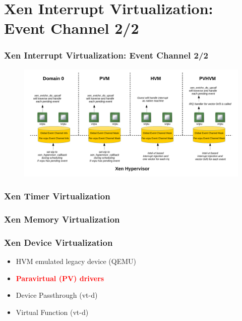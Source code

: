 \documentclass[aspectratio=169]{beamer}
\begin{document}

\section{Xen Interrupt Virtualization: Event Channel 2/2}
\begin{frame}
\frametitle{Xen Interrupt Virtualization: Event Channel 2/2}
\begin{figure}
\includegraphics[width=1.0\linewidth]{figures/evtchn.pdf}
\end{figure}
\end{frame}


\begin{frame}
\frametitle{Xen Timer Virtualization}
\end{frame}


\begin{frame}
\frametitle{Xen Memory Virtualization}
\end{frame}


\begin{frame}
\frametitle{Xen Device Virtualization}
\begin{itemize}
\item HVM emulated legacy device (QEMU) \pause
\item \textbf<5->{\textcolor<5->{red}{Paravirtual (PV) drivers}} \pause
\item Device Passthrough (vt-d) \pause
\item Virtual Function (vt-d) \pause
\end{itemize}
\end{frame}
\end{document}
